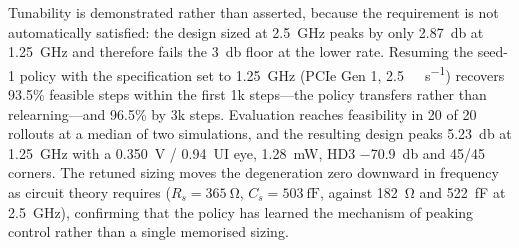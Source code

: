 \documentclass[10pt,a4paper]{article}
\begin{document}
Tunability is demonstrated rather than asserted, because the requirement is not
automatically satisfied: the design sized at \SI{2.5}{\giga\hertz} peaks by only
\SI{2.87}{\decibel} at \SI{1.25}{\giga\hertz} and therefore fails the
\SI{3}{\decibel} floor at the lower rate. Resuming the seed-1 policy with the
specification set to \SI{1.25}{\giga\hertz} (PCIe Gen 1,
\SI{2.5}{\giga\bit\per\second}) recovers 93.5\% feasible steps within the first
1k steps---the policy transfers rather than relearning---and 96.5\% by 3k steps.
Evaluation reaches feasibility in 20 of 20 rollouts at a median of two
simulations, and the resulting design peaks \SI{5.23}{\decibel} at
\SI{1.25}{\giga\hertz} with a \SI{0.350}{\volt} / \SI{0.94}{UI} eye,
\SI{1.28}{\milli\watt}, HD3 \SI{-70.9}{\decibel} and 45/45 corners. The retuned
sizing moves the degeneration zero downward in frequency as circuit theory
requires ($R_s = \SI{365}{\ohm}$, $C_s = \SI{503}{\femto\farad}$, against
\SI{182}{\ohm} and \SI{522}{\femto\farad} at \SI{2.5}{\giga\hertz}), confirming
that the policy has learned the mechanism of peaking control rather than a single
memorised sizing.



\end{document}
